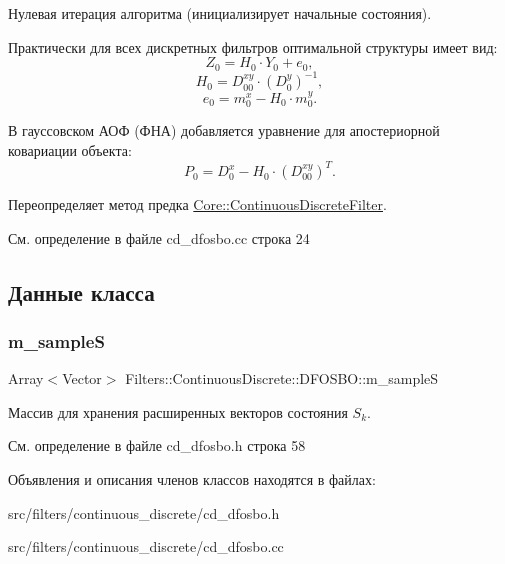 Нулевая итерация алгоритма (инициализирует начальные состояния). 

Практически для всех дискретных фильтров оптимальной структуры имеет вид\+: \[Z_0 = H_0 \cdot Y_0 + e_0,\] \[H_0 = D_{00}^{xy} \cdot (D_0^y)^{-1},\] \[e_0 = m_0^x - H_0 \cdot m_0^y.\]

В гауссовском АОФ (ФНА) добавляется уравнение для апостериорной ковариации объекта\+: \[P_0 = D_0^x - H_0 \cdot (D_{00}^{xy})^T.\] 

Переопределяет метод предка \hyperlink{class_core_1_1_continuous_discrete_filter_acc9b18241a13d46dc92ef1f02ec13e53}{Core\+::\+Continuous\+Discrete\+Filter}.



См. определение в файле cd\+\_\+dfosbo.\+cc строка 24



\subsection{Данные класса}
\hypertarget{class_filters_1_1_continuous_discrete_1_1_d_f_o_s_b_o_affccb91872f23878db490d487c481606}{}\label{class_filters_1_1_continuous_discrete_1_1_d_f_o_s_b_o_affccb91872f23878db490d487c481606} 
\subsubsection{\texorpdfstring{m\+\_\+sampleS}{m\_sampleS}}
{\footnotesize\ttfamily Array$<$Vector$>$ Filters\+::\+Continuous\+Discrete\+::\+D\+F\+O\+S\+B\+O\+::m\+\_\+sampleS\hspace{0.3cm}{\ttfamily [protected]}}

Массив для хранения расширенных векторов состояния $S_k$. 

См. определение в файле cd\+\_\+dfosbo.\+h строка 58



Объявления и описания членов классов находятся в файлах\+:\begin{DoxyCompactItemize}
\item 
src/filters/continuous\+\_\+discrete/cd\+\_\+dfosbo.\+h\item 
src/filters/continuous\+\_\+discrete/cd\+\_\+dfosbo.\+cc\end{DoxyCompactItemize}
